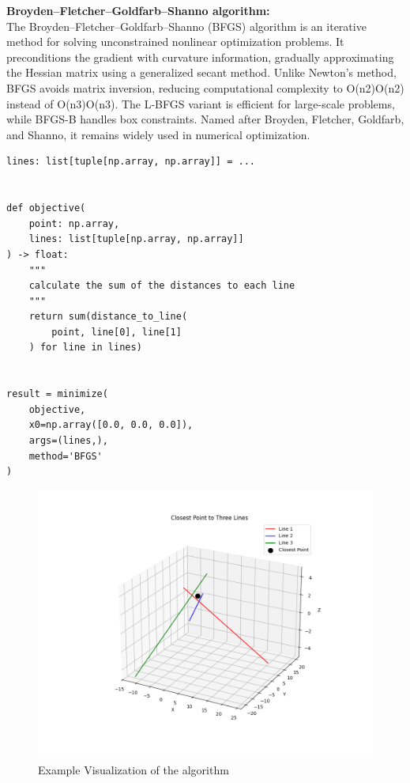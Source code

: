 \textbf{Broyden–Fletcher–Goldfarb–Shanno algorithm:} \\
The Broyden–Fletcher–Goldfarb–Shanno (BFGS) algorithm is an iterative method for solving unconstrained nonlinear optimization problems. It preconditions the gradient with curvature information, gradually approximating the Hessian matrix using a generalized secant method. Unlike Newton’s method, BFGS avoids matrix inversion, reducing computational complexity to O(n2)O(n2) instead of O(n3)O(n3). The L-BFGS variant is efficient for large-scale problems, while BFGS-B handles box constraints. Named after Broyden, Fletcher, Goldfarb, and Shanno, it remains widely used in numerical optimization.\citep{BFGS_wiki}

\hspace*{-1.2cm}

\begin{lstlisting}[caption={Example of 3D Angle Calculation}, label={lst:exampleCalculation}, style=PythonStyle]
lines: list[tuple[np.array, np.array]] = ...


def objective(
	point: np.array,
	lines: list[tuple[np.array, np.array]]
) -> float:
	"""
	calculate the sum of the distances to each line
	"""
	return sum(distance_to_line(
		point, line[0], line[1]
	) for line in lines)


result = minimize(
	objective,
	x0=np.array([0.0, 0.0, 0.0]),
	args=(lines,),
	method='BFGS'
)
\end{lstlisting}

\begin{figure}[H]
	\centering
	\hspace*{-1.5cm} 
	\includegraphics[width=400pt]{figures/approximation_algorithm}
	\caption{Example Visualization of the algorithm}
	\label{fig:approximationalgorithm}
\end{figure}


